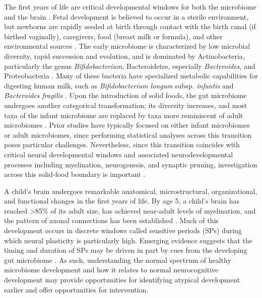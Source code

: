 \documentclass{article}
\begin{document}
The first years of life are critical developmental windows for both the
microbiome and the brain
\cite{laueDevelopingMicrobiomeBirth2022}.
Fetal development is believed to occur in a sterile environment, but newborns
are rapidly seeded at birth through contact with the birth canal (if
birthed vaginally), caregivers, food (breast milk or formula),
and other environmental sources
\cite{backhedDynamicsStabilizationHuman2015,bokulichAntibioticsBirthMode2016}.
The early microbiome is characterized by low microbial
diversity, rapid succession and evolution, and is dominated by
Actinobacteria, particularly the genus \emph{Bifidobacterium},
Bacteroidetes, especially \emph{Bacteroides}, and Proteobacteria
\cite{koenigSuccessionMicrobialConsortia2011}.
Many of these bacteria have specialized metabolic capabilities
for digesting human milk, such as \emph{Bifidobacterium longum}
subsp. \textit{infantis} and \emph{Bacteroides fragilis}
\cite{selaGenomeSequenceBifidobacterium2008}.
Upon the introduction of solid foods, the gut
microbiome undergoes another categorical transformation;
its diversity increases, and most taxa of the infant microbiome
are replaced by taxa more reminiscent of adult microbiomes
\cite{backhedDynamicsStabilizationHuman2015}.
Prior studies have typically focused on either infant microbiomes or
adult microbiomes, since performing statistical analyses across this
transition poses particular challenges. Nevertheless, since this
transition coincides with critical neural developmental windows and
associated neurodevelopmental processes including myelination, neurogenesis, and synaptic pruning,
investigation across this solid-food boundary is important
\cite{tauNormalDevelopmentBrain2010}.

A child's brain undergoes remarkable anatomical, microstructural,
organizational, and functional changes in the first years of life. By
age 5, a child's brain has reached \textgreater85\% of its adult size,
has achieved near-adult levels of myelination, and the pattern of axonal
connections has been established
\cite{silbereisCellularMolecularLandscapes2016}.
Much of this development occurs in discrete windows called
sensitive periods (SPs)
\cite{knudsenSensitivePeriodsDevelopment2004}
during which neural plasticity is particularly high.
Emerging evidence suggests that the timing and duration of SPs
may be driven in part by cues from the developing gut microbiome
\cite{callaghanNestedSensitivePeriods2020,cowanAnnualResearchReview2020}.
As such, understanding the normal spectrum of healthy microbiome
development and how it relates to normal neurocognitive development may
provide opportunities for identifying atypical development earlier and
offer opportunities for intervention.
\end{document}
